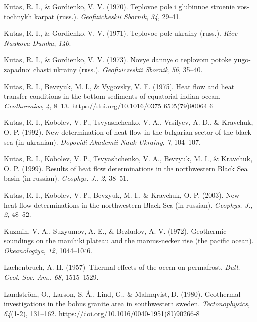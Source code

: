 \begin{CSLReferences}{1}{1}
\leavevmode{}%
Kutas, R. I., \& Gordienko, V. V. (1970). Teplovoe pole i glubinnoe stroenie vos- tochnykh karpat (russ.). \emph{Geofizicheskii Sbornik}, \emph{34}, 29--41.

\leavevmode{}%
Kutas, R. I., \& Gordienko, V. V. (1971). Teplovoe pole ukrainy (russ.). \emph{Kiev Naukova Dumka}, \emph{140}.

\leavevmode{}%
Kutas, R. I., \& Gordienko, V. V. (1973). Novye dannye o teplovom potoke yugo- zapadnoi chasti ukrainy (russ.). \emph{Geofiziczeskii Sbornik}, \emph{56}, 35--40.

\leavevmode{}%
Kutas, R. I., Bevzyuk, M. I., \& Vygovsky, V. F. (1975). Heat flow and heat transfer conditions in the bottom sediments of equatorial indian ocean. \emph{Geothermics}, \emph{4}, 8--13. \url{https://doi.org/10.1016/0375-6505(79)90064-6}

\leavevmode{}%
Kutas, R. I., Kobolev, V. P., Tsvyashchenko, V. A., Vasilyev, A. D., \& Kravchuk, O. P. (1992). New determination of heat flow in the bulgarian sector of the black sea (in ukranian). \emph{Dopovidi Akademii Nauk Ukrainy}, \emph{7}, 104--107.

\leavevmode{}%
Kutas, R. I., Kobolev, V. P., Tsvyashchenko, V. A., Bevzyuk, M. I., \& Kravchuk, O. P. (1999). Results of heat flow determinations in the northwestern {Black Sea} basin (in russian). \emph{Geophys. J.}, \emph{2}, 38--51.

\leavevmode{}%
Kutas, R. I., Kobolev, V. P., Bevzyuk, M. I., \& Kravchuk, O. P. (2003). New heat flow determinations in the northwestern {Black Sea} (in russian). \emph{Geophys. J.}, \emph{2}, 48--52.

\leavevmode{}%
Kuzmin, V. A., Suzyumov, A. E., \& Bezludov, A. V. (1972). Geothermic soundings on the manihiki plateau and the marcus-necker rise (the pacific ocean). \emph{Okeanologiya}, \emph{12}, 1044--1046.

\leavevmode{}%
Lachenbruch, A. H. (1957). Thermal effects of the ocean on permafrost. \emph{Bull. Geol. Soc. Am.}, \emph{68}, 1515--1529.

\leavevmode{}%
Landström, O., Larson, S. Å., Lind, G., \& Malmqvist, D. (1980). Geothermal investigations in the bohus granite area in southwestern sweden. \emph{Tectonophysics}, \emph{64}(1-2), 131--162. \url{https://doi.org/10.1016/0040-1951(80)90266-8}


\end{CSLReferences}
